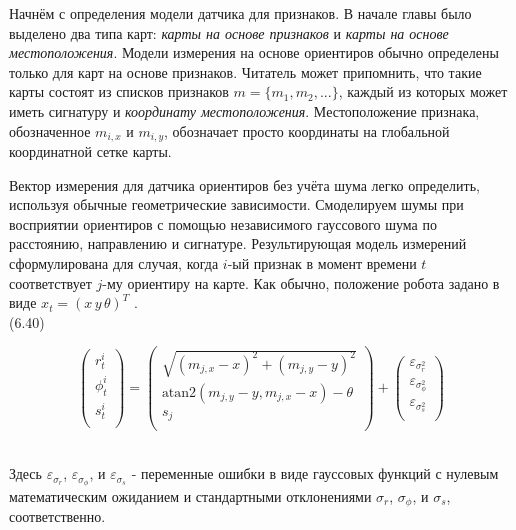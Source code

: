 \documentclass[10pt,a4paper]{article}
\begin{document}
Начнём с определения модели датчика для признаков. В начале главы было выделено два типа карт: \textit{карты на основе признаков} и \textit{карты на основе местоположения}. Модели измерения на основе ориентиров обычно определены только для карт на основе признаков. Читатель может припомнить, что такие карты состоят из списков признаков $m = \{m_1, m_2, . . .\}$, каждый из которых может иметь сигнатуру и \textit{координату местоположения}. Местоположение признака, обозначенное $m_{i,x}$ и $m_{i,y}$, обозначает просто координаты на глобальной координатной сетке карты.

Вектор измерения для датчика ориентиров без учёта шума легко определить, используя обычные геометрические зависимости. Смоделируем шумы при восприятии ориентиров с помощью независимого гауссового шума по расстоянию, направлению и сигнатуре. Результирующая модель измерений сформулирована для случая, когда $i$-ый признак в момент времени $t$ соответствует $j$-му ориентиру на карте. Как обычно, положение робота задано в виде $x_t = (x\,y\,\theta)^T$ .\\

(6.40)
\begin{minipage}{0.2\textwidth}
	\begin{equation*}
	\left(\begin{array}{c}
	r_t^i\\
	\phi_t^i\\
	s_t^i\\
	\end{array}\right)
	=
	\left(\begin{array}{c}
	\sqrt{(m_{j,x}-x)^2+(m_{j,y}-y)^2}\\
	\text{atan}2(m_{j,y}-y,m_{j,x}-x)-\theta\\
	s_j\\
	\end{array}\right)
	+
	\left(\begin{array}{c}
	\varepsilon_{\sigma_r^2}\\
	\varepsilon_{\sigma_\phi^2}\\
	\varepsilon_{\sigma_s^2}\\
	\end{array}\right)
	\end{equation*}
\end{minipage}\\

Здесь $\varepsilon_{\sigma_r}$, $\varepsilon_{\sigma_\phi}$, и $\varepsilon_{\sigma_s}$ - переменные ошибки в виде гауссовых функций с нулевым математическим ожиданием и стандартными отклонениями $\sigma_r$, $\sigma_\phi$, и $\sigma_s$, соответственно.\\
\end{document}

